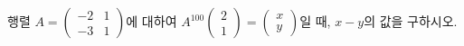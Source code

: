 \hspace*{2mm}\begin{minipage}[t]{\dimexpr\linewidth-2mm\relax}\vspace{0pt}
행렬 $A=\begin{pmatrix} -2 & 1 \\ -3 & 1 \end{pmatrix}$에 대하여 $A^{100}\begin{pmatrix} 2 \\ 1 \end{pmatrix}=\begin{pmatrix} x \\ y \end{pmatrix}$일 때, $x-y$의 값을 구하시오.\end{minipage}
